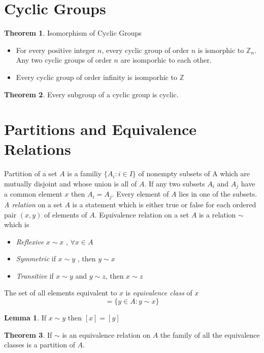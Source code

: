 \documentclass[a4paper,12pt]{article}
\theoremstyle{definition}
\theoremstyle{axiom}
\theoremstyle{theorem}
\newtheorem{theorem}{Theorem}[section]
\theoremstyle{lemma}
\newtheorem{lemma}{Lemma}[section]
\begin{document}
\section{Cyclic Groups}
\begin{theorem}{Isomorphism of Cyclic Groups}
\begin{itemize}
        \item For every positive integer $n$, every cyclic group of order $n$ is ismorphic to $\mathbb{Z}_n$. Any two cyclic groups of order $n$ are isomporhic to each other. 
       \item Every cyclic group of order infinity is isomporhic to $\mathbb{Z}$
\end{itemize} 
\end{theorem}
\begin{theorem}{}
        Every subgroup of a cyclic group is cyclic.
\end{theorem}
\section{Partitions and Equivalence Relations}
Partition of a set $A$ is a familiy $\{ A_i : i \in I \}$ of nonempty subsets of A which are mutually disjoint and whose union is all of $A$. If any two subsets $A_i$ and $A_j$ have a common element $x$ then $A_i = A_j$. Every element of $A$ lies in one of the subsets.
\\
\textit{A relation} on a set $A$ is a statement which is either true or false for each ordered pair $(x, y)$ of elements of $A$.
Equivalence relation on a set $A$ is a relation $\sim$ which is 
\begin{itemize}
    \item \textit{Reflexive} $x \sim x$ , $\forall x \in A$
    \item \textit{Symmetric} if $x \sim y$ , then $y \sim x$
    \item \textit{Transitive} if $x \sim y$ and $y \sim z$, then $x \sim z$
\end{itemize}
The set of all elements equivalent to $x$ is \textit{equivalence class} of $x$
\begin{equation*}
        [x] = \{y \in A : y \sim x\}
\end{equation*}
\begin{lemma}{}
        If $x \sim y$ then $[x] = [y]$
\end{lemma}
\begin{theorem}
        If $\sim$ is an equivalence relation on $A$ the family of all the equivalence classes is a partition of $A$.
\end{theorem}
\end{document}
